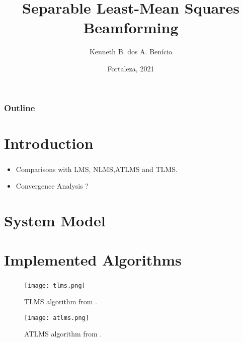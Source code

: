 \documentclass[10pt]{beamer}
\title[Short Title]{%
    Separable Least-Mean Squares Beamforming 
    \vspace{0.5cm}
}
\author{Kenneth B. dos A. Benício}
\institute{
        \textit{Department of Teleinformatics Engineering}\\
        \textit{Federal University of Ceará}
        \vspace{0.5cm}
}
\date[Fortaleza, 2021]{%
    Fortaleza, 2021
}
\begin{document}
{
    \maketitle
}


 \begin{frame}
 \frametitle{Outline}
 \tableofcontents
 \end{frame}


\section{Introduction}
\begin{frame}
    \frametitle{\insertsection}
    \begin{itemize}
        \justifying
        \item Comparisons with LMS, NLMS,ATLMS and TLMS.
        \item Convergence Analysis ? 
    \end{itemize}
\end{frame}

\section{System Model}
\begin{frame}
    \frametitle{\insertsection}

\end{frame}

\section{Implemented Algorithms}
\begin{frame}[allowframebreaks]
    \frametitle{\insertsection}
    \begin{figure}
        \centering
        \texttt{[image: tlms.png]}
        \caption{TLMS algorithm from \cite{ribeiroseparable}.}
        \label{fig:lms_alg} 
    \end{figure}
    \begin{figure}
        \centering
        \texttt{[image: atlms.png]}
        \caption{ATLMS algorithm from \cite{ribeiroseparable}.}
        \label{fig:atlms_alg} 
    \end{figure}
\end{frame}
\end{document}

